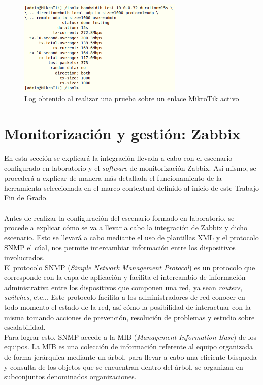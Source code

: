 \begin{figure}[H]
	\centering
	\includegraphics[width=0.7\textwidth]{img/log_test.png}
	\caption{Log obtenido al realizar una prueba sobre un enlace MikroTik activo}
	\label{logTest}
\end{figure}

\section{Monitorización y gestión: Zabbix}
En esta sección se explicará la integración llevada a cabo con el escenario configurado en laboratorio y el \textit{software} de monitorización Zabbix. Así mismo, se procederá a explicar de manera más detallada el funcionamiento de la herramienta seleccionada en el marco contextual definido al inicio de este Trabajo Fin de Grado.\\\\

Antes de realizar la configuración del escenario formado en laboratorio, se procede a explicar cómo se va a llevar a cabo la integración de Zabbix y dicho escenario. Esto se llevará a cabo mediante el uso de plantillas XML y el protocolo SNMP el cúal, nos permite intercambiar información entre los dispositivos involucrados.\\
 
El protocolo SNMP (\textit{Simple Network Management Protocol}) es un protocolo que corresponde con la capa de aplicación y facilita el intercambio de información administrativa entre los dispositivos que componen una red, ya sean \textit{routers}, \textit{switches}, etc... Este protocolo facilita a los administradores de red conocer en todo momento el estado de la red, así cómo la posibilidad de interactuar con la misma tomando acciones de prevención, resolución de problemas y estudio sobre escalabilidad.\\
Para lograr esto, SNMP accede a la MIB (\textit{Management Information Base}) de los equipos. La MIB es una colección de información referente al equipo organizada de forma jerárquica mediante un árbol, para llevar a cabo una eficiente búsqueda y consulta de los objetos que se encuentran dentro del árbol, se organizan en subconjuntos denominados organizaciones.\\\\


